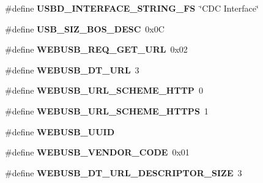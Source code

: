 \begin{DoxyCompactItemize}
\item 
\mbox{\label{group__USBD__DESC__Private__Defines_ga2562ccc9162020b79f07d813eba10ddb}} 
\#define {\bfseries U\+S\+B\+D\+\_\+\+I\+N\+T\+E\+R\+F\+A\+C\+E\+\_\+\+S\+T\+R\+I\+N\+G\+\_\+\+FS}~\char`\"{}C\+DC Interface\char`\"{}
\item 
\mbox{\label{group__USBD__DESC__Private__Defines_ga3d6767367e9b15bae8d264a78102aba8}} 
\#define {\bfseries U\+S\+B\+\_\+\+S\+I\+Z\+\_\+\+B\+O\+S\+\_\+\+D\+E\+SC}~0x0C
\item 
\mbox{\label{group__USBD__DESC__Private__Defines_gafdcb8c4a80557270c1d1524c738a4851}} 
\#define {\bfseries W\+E\+B\+U\+S\+B\+\_\+\+R\+E\+Q\+\_\+\+G\+E\+T\+\_\+\+U\+RL}~0x02
\item 
\mbox{\label{group__USBD__DESC__Private__Defines_gacbdd07c92938ce03cac9077a301e9576}} 
\#define {\bfseries W\+E\+B\+U\+S\+B\+\_\+\+D\+T\+\_\+\+U\+RL}~3
\item 
\mbox{\label{group__USBD__DESC__Private__Defines_gab2dc8df6d3e16498852b472cfe762e12}} 
\#define {\bfseries W\+E\+B\+U\+S\+B\+\_\+\+U\+R\+L\+\_\+\+S\+C\+H\+E\+M\+E\+\_\+\+H\+T\+TP}~0
\item 
\mbox{\label{group__USBD__DESC__Private__Defines_gafb81c0458a68a4d404d4503cdb5f30bf}} 
\#define {\bfseries W\+E\+B\+U\+S\+B\+\_\+\+U\+R\+L\+\_\+\+S\+C\+H\+E\+M\+E\+\_\+\+H\+T\+T\+PS}~1
\item 
\#define {\bfseries W\+E\+B\+U\+S\+B\+\_\+\+U\+U\+ID}
\item 
\mbox{\label{group__USBD__DESC__Private__Defines_gaae3cc523c6ba8ce319290e37dbfbf768}} 
\#define {\bfseries W\+E\+B\+U\+S\+B\+\_\+\+V\+E\+N\+D\+O\+R\+\_\+\+C\+O\+DE}~0x01
\item 
\mbox{\label{group__USBD__DESC__Private__Defines_ga4b50bc9e52236cce43d2216e52db5e0a}} 
\#define {\bfseries W\+E\+B\+U\+S\+B\+\_\+\+D\+T\+\_\+\+U\+R\+L\+\_\+\+D\+E\+S\+C\+R\+I\+P\+T\+O\+R\+\_\+\+S\+I\+ZE}~3

\end{DoxyCompactItemize}
